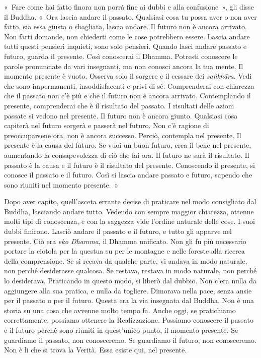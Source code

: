 «~Fare come hai fatto finora non porrà fine ai dubbi e alla
confusione~», gli disse il Buddha. «~Ora lascia andare il passato.
Qualsiasi cosa tu possa aver o non aver fatto, sia essa giusta o
sbagliata, lascia andare. Il futuro non è ancora arrivato. Non farti
domande, non chiederti come le cose potrebbero essere. Lascia andare
tutti questi pensieri inquieti, sono solo pensieri. Quando lasci andare
passato e futuro, guarda il presente. Così conoscerai il Dhamma.
Potresti conoscere le parole pronunciate da vari insegnanti, ma non
conosci ancora la tua mente. Il momento presente è vuoto. Osserva solo
il sorgere e il cessare dei \emph{saṅkhāra}. Vedi che sono impermanenti,
insoddisfacenti e privi di sé. Comprenderai con chiarezza che il passato
non c'è più e che il futuro non è ancora arrivato. Contemplando il
presente, comprenderai che è il risultato del passato. I risultati delle
azioni passate si vedono nel presente. Il futuro non è ancora giunto.
Qualsiasi cosa capiterà nel futuro sorgerà e passerà nel futuro. Non c'è
ragione di preoccuparsene ora, non è ancora successo. Perciò, contempla
nel presente. Il presente è la causa del futuro. Se vuoi un buon futuro,
crea il bene nel presente, aumentando la consapevolezza di ciò che fai
ora. Il futuro ne sarà il risultato. Il passato è la causa e il futuro è
il risultato del presente. Conoscendo il presente, si conosce il passato
e il futuro. Così si lascia andare passato e futuro, sapendo che sono
riuniti nel momento presente.~»

Dopo aver capito, quell'asceta errante decise di praticare nel modo
consigliato dal Buddha, lasciando andare tutto. Vedendo con sempre
maggior chiarezza, ottenne molti tipi di conoscenza, e con la saggezza
vide l'ordine naturale delle cose. I suoi dubbi finirono. Lasciò andare
il passato e il futuro, e tutto gli apparve nel presente. Ciò era
\emph{eko Dhamma}, il Dhamma unificato. Non gli fu più necessario
portare la ciotola per la questua su per le montagne e nelle foreste
alla ricerca della comprensione. Se si recava da qualche parte, vi
andava in modo naturale, non perché desiderasse qualcosa. Se restava,
restava in modo naturale, non perché lo desiderava. Praticando in questo
modo, si liberò dal dubbio. Non c'era nulla da aggiungere alla sua
pratica, e nulla da togliere. Dimorava nella pace, senza ansie per il
passato o per il futuro. Questa era la via insegnata dal Buddha. Non è
una storia su una cosa che avvenne molto tempo fa. Anche oggi, se
pratichiamo correttamente, possiamo ottenere la Realizzazione. Possiamo
conoscere il passato e il futuro perché sono riuniti in quest'unico
punto, il momento presente. Se guardiamo il passato, non conosceremo. Se
guardiamo il futuro, non conosceremo. Non è lì che si trova la Verità.
Essa esiste qui, nel presente.

